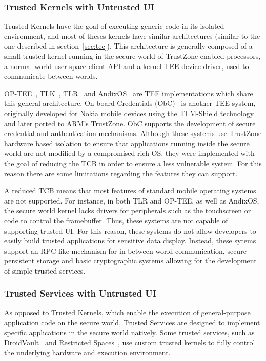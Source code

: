 \subsubsection{Trusted Kernels with Untrusted UI}

Trusted Kernels have the goal of executing generic code in its isolated environment, and most of theses kernels have similar architectures (similar to the one described in section~\ref{sec:tee}). This architecture is generally composed of a small trusted kernel running in the secure world of TrustZone-enabled processors, a normal world user space client API and a kernel TEE device driver, used to communicate between worlds.

OP-TEE~\cite{op_tee}, TLK~\cite{tlk}, TLR~\cite{santos2011trusted} and AndixOS~\cite{fitzekandix} are \ac{TEE} implementations which share this general architecture. On-board Credentials (ObC)~\cite{kostiainen2012board} is another \ac{TEE} system, originally developed for Nokia mobile devices using the TI M-Shield technology and later ported to ARM's TrustZone. ObC supports the development of secure credential and authentication mechanisms. Although these systems use TrustZone hardware based isolation to ensure that applications running inside the secure world are not modified by a compromised rich OS, they were implemented with the goal of reducing the \ac{TCB} in order to ensure a less vulnerable system. For this reason there are some limitations regarding the features they can support.

A reduced \ac{TCB} means that most features of standard mobile operating systems are not supported. For instance, in both TLR and OP-TEE, as well as AndixOS, the secure world kernel lacks drivers for peripherals such as the touchscreen or code to control the framebuffer. Thus, these systems are not capable of supporting trusted UI. For this reason, these systems do not allow developers to easily build trusted applications for sensitive data display. Instead, these sytems support an RPC-like mechanism for in-between-world communication, secure persistent storage and basic cryptographic systems allowing for the development of simple trusted services.

\subsubsection{Trusted Services with Untrusted UI}

As opposed to Trusted Kernels, which enable the execution of general-purpose application code on the secure world, Trusted Services are designed to implement specific applications in the secure world natively. Some trusted services, such as DroidVault~\cite{li2014droidvault} and Restricted Spaces~\cite{brasserregulating}, use custom trusted kernels to fully control the underlying hardware and execution environment.

